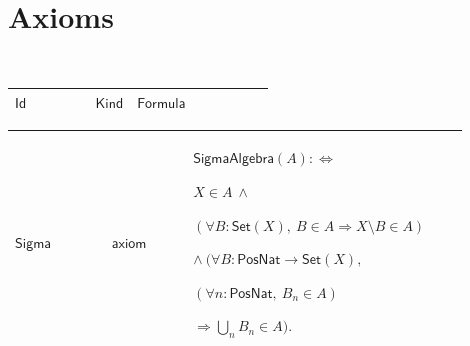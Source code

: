 \documentclass[12pt,reqno]{amsart}
\theoremstyle{blueplain}
\numberwithin{equation}{section}
\newlength{\FATOUOneColumnBody}
\begin{document}
{\scriptsize \ }

\section{\protect\scriptsize Axioms}

{\scriptsize {\ }}

{\scriptsize \setlength{\parskip}{0pt}\nointerlineskip
\noindent 
\begin{tabular}{|@{}>{\centering\arraybackslash}m{\FATOUOneColumnBody}|}
\hline
$\displaystyle \mathsf{Axioms}$ \\ \hline
\end{tabular}%
}

{\scriptsize \setlength{\parskip}{0pt}\nointerlineskip
\noindent 
\begin{tabular}{|@{}>{\centering\arraybackslash}m{0.19251\linewidth}|>{\centering\arraybackslash}m{0.16845\linewidth}|>{\centering\arraybackslash}m{0.53904\linewidth}|}
\hline
$\displaystyle \mathsf{Id}$ & $\displaystyle \mathsf{Kind}$ & $\displaystyle 
\mathsf{Formula}$ \\ \hline
\end{tabular}%
}

{\scriptsize \setlength{\parskip}{0pt}\nointerlineskip
\noindent 
\begin{tabular}{|@{}>{\centering\arraybackslash}m{0.19251\linewidth}|>{\centering\arraybackslash}m{0.16845\linewidth}|>{\centering\arraybackslash}m{0.53904\linewidth}|}
\hline
\hypertarget{ax:Sigma}{$\displaystyle \mathsf{Sigma}$} & $\displaystyle 
\mathsf{axiom}$ & $\displaystyle \mathsf{SigmaAlgebra}(A):%
\Longleftrightarrow $\par$\displaystyle X\in A\ \land$\par$\displaystyle %
(\forall B:\mathsf{Set}(X),\ B\in A\Rightarrow X\setminus B\in A)$\par$%
\displaystyle \land\ (\forall B:\mathsf{PosNat}\to\mathsf{Set}(X),$\par$%
\displaystyle (\forall n:\mathsf{PosNat},\ B_n\in A)$\par$\displaystyle %
\Rightarrow\bigcup_n B_n\in A).$ \\ \hline
\end{tabular}%
}
\end{document}
